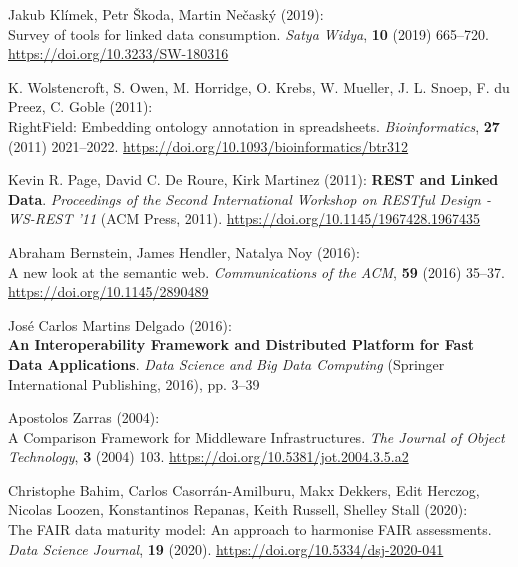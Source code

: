 \begin{thebibliography}{9}
Jakub Klímek, Petr Škoda, Martin Nečaský (2019): \\
Survey of tools for
linked data consumption. \emph{Satya Widya}, \textbf{10} (2019)
665--720.
\url{https://doi.org/10.3233/SW-180316}

K. Wolstencroft, S. Owen, M. Horridge, O. Krebs, W. Mueller, J. L.
Snoep, F. du Preez, C. Goble (2011): \\
{RightField}: Embedding ontology
annotation in spreadsheets. \emph{Bioinformatics}, \textbf{27} (2011)
2021--2022.
\url{https://doi.org/10.1093/bioinformatics/btr312}

Kevin R. Page, David C. De Roure, Kirk Martinez (2011):
\textbf{{REST} and {Linked Data}}. \emph{Proceedings of the {Second
International Workshop} on {RESTful Design} - {WS-REST} '11} ({ACM
Press}, 2011).
\url{https://doi.org/10.1145/1967428.1967435}

Abraham Bernstein, James Hendler, Natalya Noy (2016): \\
A new look at
the semantic web. \emph{Communications of the ACM}, \textbf{59} (2016)
35--37.
\url{https://doi.org/10.1145/2890489}

José Carlos Martins Delgado (2016): \\
\textbf{An {Interoperability Framework} and {Distributed Platform} for {Fast Data Applications}}.
\emph{Data {Science} and {Big Data Computing}} ({Springer International
Publishing}, 2016), pp. 3--39

Apostolos Zarras (2004): \\
A {Comparison Framework} for {Middleware Infrastructures}. \emph{The Journal of Object Technology}, \textbf{3}
(2004) 103.
\url{https://doi.org/10.5381/jot.2004.3.5.a2}

Christophe Bahim, Carlos Casorrán-Amilburu, Makx Dekkers, Edit Herczog,
Nicolas Loozen, Konstantinos Repanas, Keith Russell, Shelley Stall
(2020): \\
The {FAIR} data maturity model: {An} approach to harmonise
{FAIR} assessments. \emph{Data Science Journal}, \textbf{19} (2020).
\url{https://doi.org/10.5334/dsj-2020-041}


\end{thebibliography}

